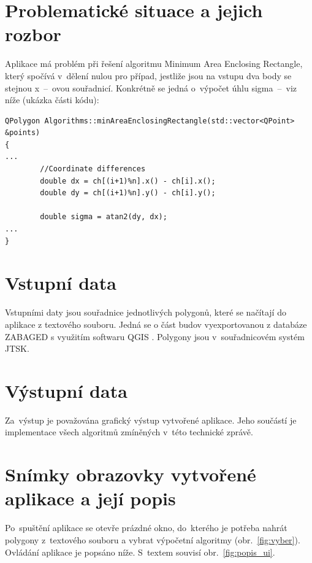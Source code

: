 \documentclass[a4paper, 12pt, oneside, titlepage]{article} %
\begin{document}
\section{Problematické situace a jejich rozbor} \label{problemrozbor}
Aplikace má problém při řešení algoritmu Minimum Area Enclosing Rectangle, který spočívá v~dělení nulou pro případ, jestliže jsou na vstupu dva body se stejnou x~--~ovou souřadnicí. Konkrétně se jedná o~výpočet úhlu sigma~--~viz níže (ukázka části kódu):

\begin{verbatim}
QPolygon Algorithms::minAreaEnclosingRectangle(std::vector<QPoint> &points)
{
...
        //Coordinate differences
        double dx = ch[(i+1)%n].x() - ch[i].x();
        double dy = ch[(i+1)%n].y() - ch[i].y();

        double sigma = atan2(dy, dx);
...
}
\end{verbatim}


\section{Vstupní data}
Vstupními daty jsou souřadnice jednotlivých polygonů, které se načítají do aplikace z textového souboru. Jedná se o část budov vyexportovanou z databáze ZABAGED \cite{ZABAGED} s využitím softwaru QGIS \cite{qgis}. Polygony jsou v~souřadnicovém systém JTSK.


\section{Výstupní data}
Za~výstup je považována grafický výstup vytvořené aplikace. Jeho součástí je implementace všech algoritmů zmíněných v~této technické zprávě. 


\section{Snímky obrazovky vytvořené aplikace a její popis}

Po~spuštění aplikace se otevře prázdné okno, do~kterého je potřeba nahrát polygony z~textového souboru a vybrat výpočetní algoritmy (obr.~\ref{fig:vyber}). Ovládání aplikace je popsáno níže. S~textem souvisí obr.~\ref{fig:popis_ui}.
\end{document}
